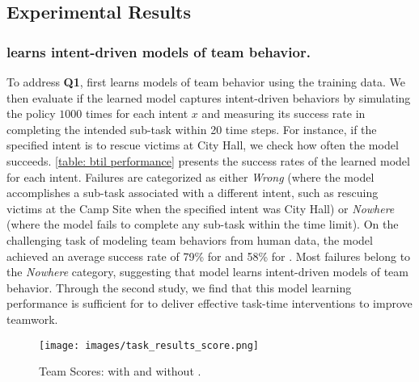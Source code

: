 \subsection{Experimental Results}
\label{sec:findings}

\subsubsection{\coach learns intent-driven models of team behavior.}
\label{sec: model learning results}
To address \textbf{Q1}, \coach first learns models of team behavior using the training data. We then evaluate if the learned model captures intent-driven behaviors by simulating the policy $1000$ times for each intent $x$ and measuring its success rate in completing the intended sub-task within 20 time steps. For instance, if the specified intent is to rescue victims at City Hall, we check how often the model succeeds.
\cref{table: btil performance} presents the success rates of the learned model for each intent. Failures are categorized as either \textit{Wrong} (where the model accomplishes a sub-task associated with a different intent, such as rescuing victims at the Camp Site when the specified intent was City Hall) or \textit{Nowhere} (where the model fails to complete any sub-task within the time limit). 
On the challenging task of modeling team behaviors from human data, the model achieved an average success rate of 79\% for \movers and 58\% for \rescue. Most failures belong to the \textit{Nowhere} category, suggesting that model learns intent-driven models of team behavior. Through the second study, we find that this model learning performance is sufficient for \coach to deliver effective task-time interventions to improve teamwork.

\begin{figure}
\centering
\texttt{[image: images/task\_results\_score.png]} \vspace{-1em}
\caption{Team Scores: with and without \coach.} \vspace{-1em}
\label{fig. task results} 
\end{figure}
